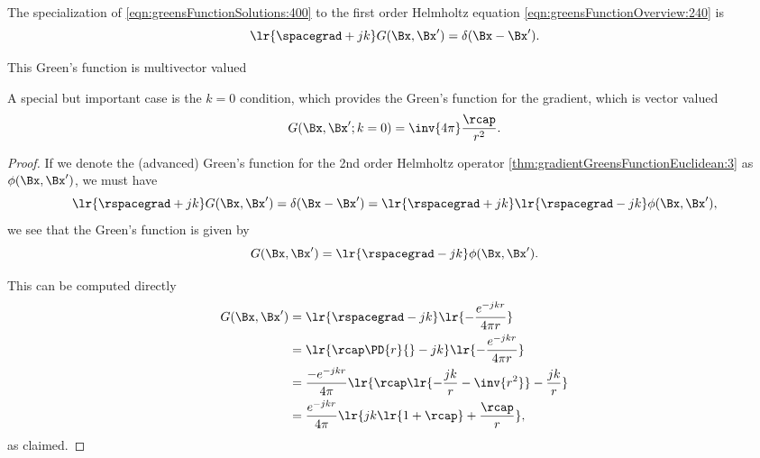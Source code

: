 %
%

The specialization of \cref{eqn:greensFunctionSolutions:400} to the first order Helmholtz equation \cref{eqn:greensFunctionOverview:240} is
\begin{equation}\label{eqn:greensFunctionFirstOrderHelmholtz:700}
\lr{ \spacegrad + j k } G(\Bx, \Bx')  = \delta(\Bx - \Bx').
\end{equation}

This Green's function is multivector valued

A special but important case is the \( k = 0 \) condition, which provides the
Green's function for the gradient, which is vector valued
\begin{equation}\label{eqn:greensFunctionFirstOrderHelmholtz:900}
G(\Bx, \Bx' ; k = 0) = \inv{4 \pi} \frac{\rcap}{r^2}.
\end{equation}
\begin{proof}
If we denote the (advanced) Green's function for the 2nd order Helmholtz operator
\cref{thm:gradientGreensFunctionEuclidean:3}
as \( \phi(\Bx, \Bx') \), we must have
\begin{equation}\label{eqn:greensFunctionFirstOrderHelmholtz:740}
\lr{ \rspacegrad + j k } G(\Bx, \Bx') = \delta(\Bx - \Bx') =
\lr{ \rspacegrad + j k } \lr{ \rspacegrad - j k } \phi(\Bx, \Bx'),
\end{equation}
we see that the Green's function is given by
\begin{equation}\label{eqn:greensFunctionFirstOrderHelmholtz:760}
G(\Bx, \Bx')
=
\lr{ \rspacegrad - j k } \phi(\Bx, \Bx').
\end{equation}

This can be computed directly
\begin{equation}\label{eqn:greensFunctionFirstOrderHelmholtz:780}
\begin{aligned}
G(\Bx, \Bx')
&= \lr{ \rspacegrad - j k } \lr{ -\frac{e^{-j k r}}{4 \pi r} } \\
&= \lr{ \rcap \PD{r}{} -j k } \lr{ -\frac{e^{-j k r}}{4 \pi r} } \\
&= \frac{-e^{-j k r}}{4 \pi} \lr{ \rcap \lr{ -\frac{j k}{r} - \inv{ r^2 } } - \frac{j k}{r} } \\
&= \frac{e^{-j k r}}{4 \pi} \lr{ j k \lr{ 1 + \rcap } + \frac{\rcap}{r} },
\end{aligned}
\end{equation}
as claimed.
\end{proof}
